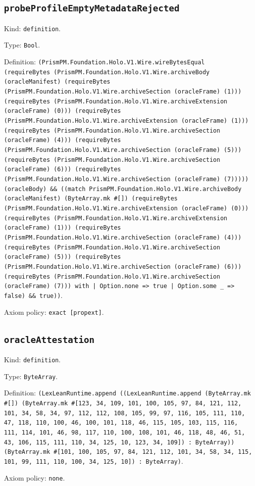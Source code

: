 \documentclass[11pt]{article}
\begin{document}
\subsection*{\texttt{probeProfileEmptyMetadataRejected}}
\noindent Kind: \texttt{definition}.\par
\noindent Type: \texttt{Bool}.\par
\noindent Definition: \texttt{(PrismPM.Foundation.Holo.V1.Wire.wireBytesEqual (requireBytes (PrismPM.Foundation.Holo.V1.Wire.archiveBody (oracleManifest) (requireBytes (PrismPM.Foundation.Holo.V1.Wire.archiveSection (oracleFrame) (1))) (requireBytes (PrismPM.Foundation.Holo.V1.Wire.archiveExtension (oracleFrame) (0))) (requireBytes (PrismPM.Foundation.Holo.V1.Wire.archiveExtension (oracleFrame) (1))) (requireBytes (PrismPM.Foundation.Holo.V1.Wire.archiveSection (oracleFrame) (4))) (requireBytes (PrismPM.Foundation.Holo.V1.Wire.archiveSection (oracleFrame) (5))) (requireBytes (PrismPM.Foundation.Holo.V1.Wire.archiveSection (oracleFrame) (6))) (requireBytes (PrismPM.Foundation.Holo.V1.Wire.archiveSection (oracleFrame) (7))))) (oracleBody) \&\& ((match PrismPM.Foundation.Holo.V1.Wire.archiveBody (oracleManifest) (ByteArray.mk \#[]) (requireBytes (PrismPM.Foundation.Holo.V1.Wire.archiveExtension (oracleFrame) (0))) (requireBytes (PrismPM.Foundation.Holo.V1.Wire.archiveExtension (oracleFrame) (1))) (requireBytes (PrismPM.Foundation.Holo.V1.Wire.archiveSection (oracleFrame) (4))) (requireBytes (PrismPM.Foundation.Holo.V1.Wire.archiveSection (oracleFrame) (5))) (requireBytes (PrismPM.Foundation.Holo.V1.Wire.archiveSection (oracleFrame) (6))) (requireBytes (PrismPM.Foundation.Holo.V1.Wire.archiveSection (oracleFrame) (7))) with | Option.none => true | Option.some \_ => false) \&\& true))}.\par
\noindent Axiom policy: \texttt{exact [propext]}.\par
\subsection*{\texttt{oracleAttestation}}
\noindent Kind: \texttt{definition}.\par
\noindent Type: \texttt{ByteArray}.\par
\noindent Definition: \texttt{(LexLeanRuntime.append ((LexLeanRuntime.append (ByteArray.mk \#[]) (ByteArray.mk \#[123, 34, 109, 101, 100, 105, 97, 84, 121, 112, 101, 34, 58, 34, 97, 112, 112, 108, 105, 99, 97, 116, 105, 111, 110, 47, 118, 110, 100, 46, 100, 101, 118, 46, 115, 105, 103, 115, 116, 111, 114, 101, 46, 98, 117, 110, 100, 108, 101, 46, 118, 48, 46, 51, 43, 106, 115, 111, 110, 34, 125, 10, 123, 34, 109]) : ByteArray)) (ByteArray.mk \#[101, 100, 105, 97, 84, 121, 112, 101, 34, 58, 34, 115, 101, 99, 111, 110, 100, 34, 125, 10]) : ByteArray)}.\par
\noindent Axiom policy: \texttt{none}.\par
\end{document}
